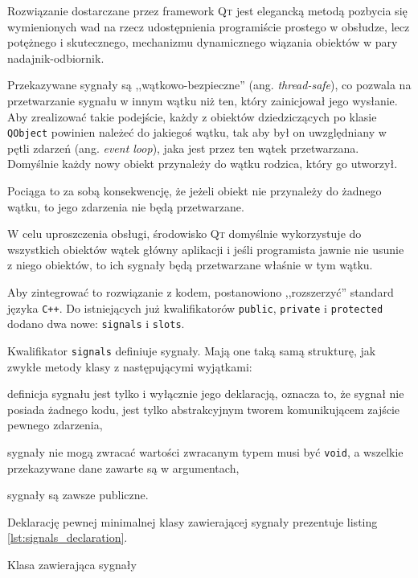 Rozwiązanie dostarczane przez framework \textsc{Qt} jest elegancką metodą pozbycia się wymienionych wad na rzecz udostępnienia programiście prostego w obsłudze, lecz potężnego i skutecznego, mechanizmu dynamicznego wiązania obiektów w pary nadajnik-odbiornik.

Przekazywane sygnały są ,,wątkowo-bezpieczne'' (ang. \textsl{thread-safe}), co pozwala na przetwarzanie sygnału w innym wątku niż ten, który zainicjował jego wysłanie. Aby zrealizować takie podejście, każdy z obiektów dziedziczących po klasie \verb|QObject| powinien należeć do jakiegoś wątku, tak aby był on uwzględniany w pętli zdarzeń (ang. \textsl{event loop}), jaka jest przez ten wątek przetwarzana. Domyślnie każdy nowy obiekt przynależy do wątku rodzica, który go utworzył.

Pociąga to za sobą konsekwencję, że jeżeli obiekt nie przynależy do żadnego wątku, to jego zdarzenia nie będą przetwarzane.

W celu uproszczenia obsługi, środowisko \textsc{Qt} domyślnie wykorzystuje do wszystkich obiektów wątek główny aplikacji i jeśli programista jawnie nie usunie z niego obiektów, to ich sygnały będą przetwarzane właśnie w tym wątku.

Aby zintegrować to rozwiązanie z kodem, postanowiono ,,rozszerzyć'' standard języka \verb|C++|. Do istniejących już kwalifikatorów \verb|public|, \verb|private| i \verb|protected| dodano dwa nowe: \verb|signals| i \verb|slots|.

Kwalifikator \verb|signals| definiuje sygnały. Mają one taką samą strukturę, jak zwykłe metody klasy z następującymi wyjątkami:
\begin{aenumerate}
  \item definicja sygnału jest tylko i wyłącznie jego deklaracją, oznacza to, że sygnał nie posiada żadnego kodu, jest tylko abstrakcyjnym tworem komunikującem zajście pewnego zdarzenia,
  \item sygnały nie mogą zwracać wartości \ppauza zwracanym typem musi być \verb|void|, a wszelkie przekazywane dane zawarte są w argumentach,
  \item sygnały są zawsze publiczne.
\end{aenumerate}

Deklarację pewnej minimalnej klasy zawierającej sygnały prezentuje listing \ref{lst:signals_declaration}.

\begin{listing}
  
  \caption{Klasa zawierająca sygnały}
  \label{lst:signals_declaration}
\end{listing}

